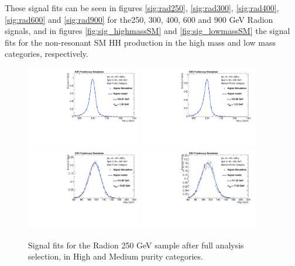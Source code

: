 These signal fits can be seen in figures \ref{sig:rad250}, \ref{sig:rad300}, \ref{sig:rad400}, \ref{sig:rad600} and \ref{sig:rad900} for the250, 300, 400, 600 and 900 GeV Radion signals, and in figures \ref{fig:sig_highmassSM} and \ref{fig:sig_lowmassSM} the signal fits for the non-resonant SM HH production in the high mass and low mass categories, respectively.

\begin{figure}[thb]
  \centering
  \includegraphics[width=0.45\textwidth]{figures/sec-signals/Rad250_signal_fit_mgg_cat0}\hfil
  \includegraphics[width=0.45\textwidth]{figures/sec-signals/Rad250_signal_fit_mgg_cat1}\hfil
  \includegraphics[width=0.45\textwidth]{figures/sec-signals/Rad250_signal_fit_mjj_cat0}\hfil
  \includegraphics[width=0.45\textwidth]{figures/sec-signals/Rad250_signal_fit_mjj_cat1}\hfil
  \caption{Signal fits for the Radion 250 GeV sample after full analysis selection, in High and Medium purity categories.}
  \label{fig:rad250}
\end{figure}

